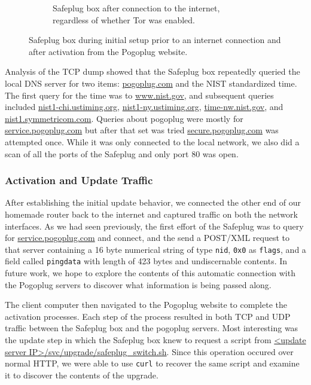 \begin{figure}[htb]
\begin{subfigure}[b]{0.4\textwidth}
                \caption{Safeplug box after connection to the internet, regardless of whether Tor was enabled.}
                \label{greenlight}
        \end{subfigure}
        \caption{Safeplug box during initial setup prior to an internet connection and after activation from the Pogoplug website.}
        \label{fig:lights}
\end{figure}

Analysis of the TCP dump showed that the Safeplug box repeatedly queried the local DNS server for two items: \url{pogoplug.com} and the NIST standardized time.  The first query for the time was to \url{www.nist.gov}, and subsequent queries included \url{nist1-chi.ustiming.org}, \url{nist1-ny.ustiming.org}, \url{time-nw.nist.gov}, and \url{nist1.symmetricom.com}.  Queries about pogoplug were mostly for \url{service.pogoplug.com} but after that set was tried \url{secure.pogoplug.com} was attempted once.  While it was only connected to the local network, we also did a scan of all the ports of the Safeplug and only port 80 was open.

\subsubsection{Activation and Update Traffic}
\label{updatetraf}
After establishing the initial update behavior, we connected the other end of our homemade router back to the internet and captured traffic on both the network interfaces. As we had seen previously, the first effort of the Safeplug was to query for \url{service.pogoplug.com} and connect, and the send a POST/XML request to that server containing a 16 byte numerical string of type \verb!nid!, \verb!0x0! as \verb!flags!, and a field called \verb!pingdata! with length of 423 bytes and undiscernable contents.  In future work, we hope to explore the contents of this automatic connection with the Pogoplug servers to discover what information is being passed along. 

The client computer then navigated to the Pogoplug website to complete the activation processes.  Each step of the process resulted in both TCP and UDP traffic between the Safeplug box and the pogoplug servers.  Most interesting was the update step in which the Safeplug box knew to request a script from \url{<update server IP>/svc/upgrade/safeplug\_switch.sh}.  Since this operation occured over normal HTTP, we were able to use \verb!curl! to recover the same script and examine it to discover the contents of the upgrade.

